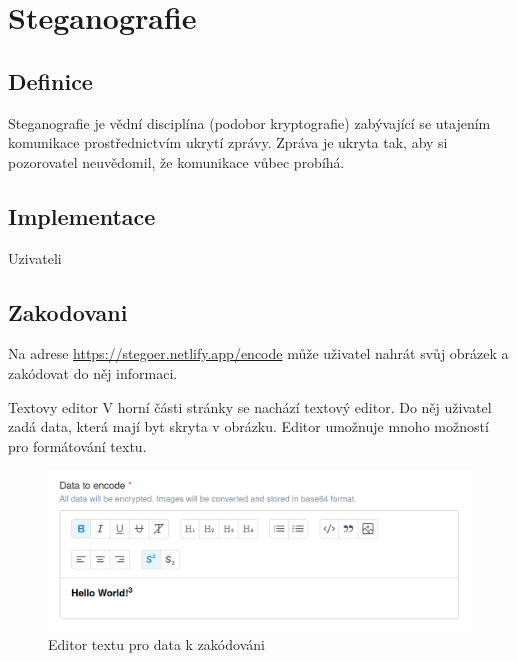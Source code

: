 
\section{Steganografie}\label{sec:steganografie}

\subsection{Definice}\label{subsec:definice}
Steganografie je vědní disciplína (podobor kryptografie) zabývající se utajením
komunikace prostřednictvím ukrytí zprávy.
Zpráva je ukryta tak, aby si pozorovatel neuvědomil,
že komunikace vůbec probíhá.\cite{wiki:steganografie}

\subsection{Implementace}\label{subsec:implementace}
Uzivateli

\subsection{Zakodovani}\label{subsec:zakodovani-dat}
Na adrese \url{https://stegoer.netlify.app/encode} může uživatel nahrát svůj
obrázek a zakódovat do něj informaci.

\begin{subsubsection}{Textovy editor}\label{subsubsec:textovy-editor}
V horní části stránky se nachází textový editor.
Do něj uživatel zadá data, která mají byt skryta v obrázku.
Editor umožnuje mnoho možností pro formátování textu.

\begin{figure}
    \centering
    \includegraphics[scale=0.5]{assets/images/encode-editor}
    \caption{Editor textu pro data k zakódováni}\label{fig:editor-textu}
\end{figure}

\end{subsubsection}

